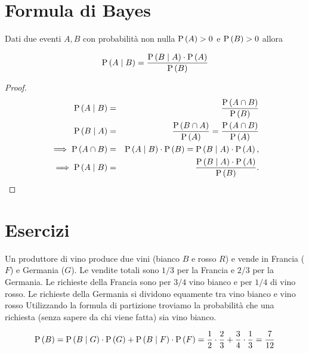\section{Formula di Bayes}

\begin{lem}
	Dati due eventi $ A,B $ con probabilit\`a non nulla $ \text{P}\left(A\right) > 0 $ e $ \text{P}\left(B\right) > 0 $ allora 
	
	\begin{equation}
	\text{P}\left(A \mid B\right) = \dfrac{\text{P}\left(B \mid A\right) \cdot \text{P}\left(A\right) }{\text{P}\left(B\right)}
	\end{equation}
	
	\begin{proof}
		\begin{eqnarray*}
			\text{P}\left(A \mid B\right) &=& \frac{\text{P}\left(A\cap B\right)}{\text{P}\left(B\right)} \\
			\text{P}\left(B \mid A\right) &=& \frac{\text{P}\left(B\cap A\right)}{\text{P}\left(A\right)}=\frac{\text{P}\left(A\cap B\right)}{\text{P}\left(A\right)} \\
			\implies \text{P}\left(A\cap B\right) &=&  \text{P}\left(A\mid B\right)\cdot \text{P}\left(B\right)=\text{P}\left(B\mid A\right)\cdot \text{P}\left(A\right), \\
			\implies \text{P}\left(A \mid B\right) &=&  \frac{\text{P}\left(B \mid A\right)  \cdot \text{P}\left(A\right)} {\text{P}\left(B\right)}.
		\end{eqnarray*}
	\end{proof}
\end{lem}

\section{Esercizi}


\begin{exrc}
	Un produttore di vino produce due vini (bianco $ B $ e rosso $ R $) e vende in Francia ($ F $) e Germania ($ G $). 
	Le vendite totali sono $ 1/3 $ per la Francia e $ 2/3 $ per la Germania. Le richieste della Francia sono
	per $ 3/4 $ vino bianco e per $ 1/4 $ di vino rosso. Le richieste della Germania si dividono equamente
	tra vino bianco e vino rosso
	Utilizzando la formula di partizione troviamo la probabilit\`a che una richiesta (senza sapere
	da chi viene fatta) sia vino bianco.

	\begin{equation*}
	\text{P}\left(B\right) = \text{P}\left(B \mid G\right) \cdot \text{P}\left(G\right) + \text{P}\left(B \mid F\right) \cdot \text{P}\left(F\right) = \frac12 \cdot \frac23 +
	\frac34 \cdot \frac13= \dfrac{7}{12}
	\end{equation*}
\end{exrc}

